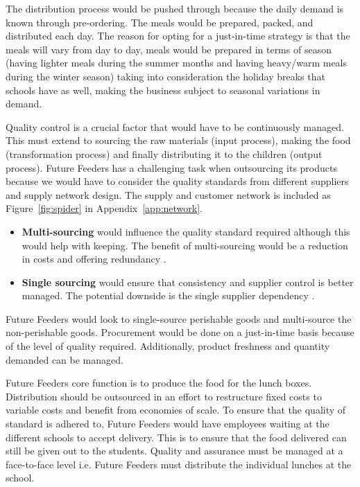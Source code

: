 The distribution process would be pushed through because the daily demand is known through pre-ordering. The meals would be prepared, packed, and distributed each day. The reason for opting for a just-in-time strategy is that the meals will vary from day to day, meals would be prepared in terms of season (having lighter meals during the summer months and having heavy/warm meals during the winter season) taking into consideration the holiday breaks that schools have as well, making the business subject to seasonal variations in demand.

Quality control is a crucial factor that would have to be continuously managed. This must extend to sourcing the raw materials (input process), making the food (transformation process) and finally distributing it to the children (output process). Future Feeders has a challenging task when outsourcing its products because we would have to consider the quality standards from different suppliers and supply network design. The supply and customer network is included as Figure~\ref{fig:spider} in Appendix~\ref{app:network}.

\begin{itemize}
    \item \textbf{Multi-sourcing} would influence the quality standard required although this would help with keeping. The benefit of multi-sourcing would be a reduction in costs and offering redundancy \cite[p. 337]{ops_book}.
    \item \textbf{Single sourcing} would ensure that consistency and supplier control is better managed. The potential downside is the single supplier dependency \cite[p. 337]{ops_book}.
\end{itemize}

Future Feeders would look to single-source perishable goods and multi-source the non-perishable goods. Procurement would be done on a just-in-time basis because of the level of quality required. Additionally, product freshness and quantity demanded can be managed.

Future Feeders core function is to produce the food for the lunch boxes. Distribution should be outsourced in an effort to restructure fixed costs to variable costs and benefit from economies of scale. To ensure that the quality of standard is adhered to, Future Feeders would have employees waiting at the different schools to accept delivery. This is to ensure that the food delivered can still be given out to the students. Quality and assurance must be managed at a face-to-face level i.e. Future Feeders must distribute the individual lunches at the school.


